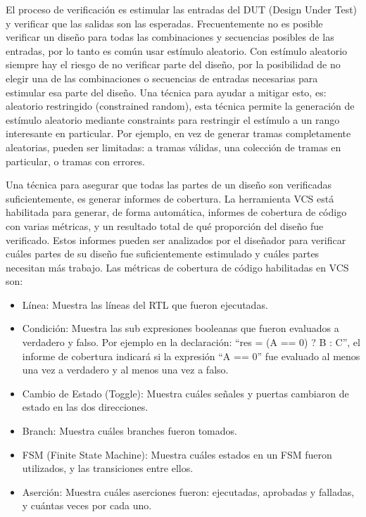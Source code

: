 \documentclass[a4paper, twoside, 11pt]{report}
\begin{document}
El proceso de verificación es estimular las entradas del DUT (Design Under Test) y verificar que las salidas son las esperadas. Frecuentemente no es posible verificar un diseño para todas las combinaciones y secuencias posibles de las entradas, por lo tanto es común usar estímulo aleatorio. Con estímulo aleatorio siempre hay el riesgo de no verificar parte del diseño, por la posibilidad de no elegir una de las combinaciones o secuencias de entradas necesarias para estimular esa parte del diseño. Una técnica para ayudar a mitigar esto, es: aleatorio restringido (constrained random), esta técnica permite la generación de estímulo aleatorio mediante constraints para restringir el estímulo a un rango interesante en particular. Por ejemplo, en vez de generar tramas completamente aleatorias, pueden ser limitadas: a tramas válidas, una colección de tramas en particular, o tramas con errores.

Una técnica para asegurar que todas las partes de un diseño son verificadas suficientemente, es generar informes de cobertura. La herramienta VCS está habilitada para generar, de forma automática, informes de cobertura de código con varias métricas, y un resultado total de qué proporción del diseño fue verificado. Estos informes pueden ser analizados por el diseñador para verificar cuáles partes de su diseño fue suficientemente estimulado y cuáles partes necesitan más trabajo. Las métricas de cobertura de código habilitadas en VCS son:

\begin{itemize}
  \item Línea: Muestra las líneas del RTL que fueron ejecutadas.
  \item Condición: Muestra las sub expresiones booleanas que fueron evaluados a verdadero y falso. Por ejemplo en la declaración: “res = (A == 0) ? B : C”, el informe de cobertura indicará si la expresión “A == 0” fue evaluado al menos una vez a verdadero y al menos una vez a falso.
  \item Cambio de Estado (Toggle): Muestra cuáles señales y puertas cambiaron de estado en las dos direcciones.
  \item Branch: Muestra cuáles branches fueron tomados.
  \item FSM (Finite State Machine): Muestra cuáles estados en un FSM fueron utilizados, y las transiciones entre ellos.
  \item Aserción: Muestra cuáles aserciones fueron: ejecutadas, aprobadas y falladas, y cuántas veces por cada uno.
\end{itemize}
\end{document}
